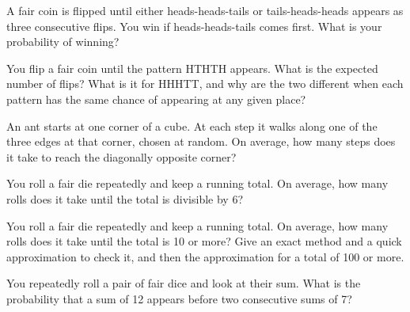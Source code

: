 \begin{question}\label{iq:iv1:waiting-times-and-markov-chains:6}
A fair coin is flipped until either heads-heads-tails or tails-heads-heads appears as three consecutive flips. You win if heads-heads-tails comes
first. What is your probability of winning?
\end{question}

\begin{question}\label{iq:iv1:waiting-times-and-markov-chains:7}
You flip a fair coin until the pattern HTHTH appears. What is the expected number of flips? What is it for HHHTT, and why are the two different when each pattern has the same chance of appearing at any given place?
\end{question}

\begin{question}\label{iq:iv1:waiting-times-and-markov-chains:8}
An ant starts at one corner of a cube. At each step it walks along one of the three edges at that corner, chosen at random. On average, how many
steps does it take to reach the diagonally opposite corner?
\end{question}

\begin{question}\label{iq:iv1:waiting-times-and-markov-chains:9}
You roll a fair die repeatedly and keep a running total. On average, how many rolls does it take until the total is divisible by 6?
\end{question}

\begin{question}\label{iq:iv1:waiting-times-and-markov-chains:10}
You roll a fair die repeatedly and keep a running total. On average, how many rolls does it take until the total is 10 or more? Give an exact method and a quick
approximation to check it, and then the approximation for a total of 100 or more.
\end{question}

\begin{question}\label{iq:iv1:waiting-times-and-markov-chains:11}
You repeatedly roll a pair of fair dice and look at their sum. What is the probability that a sum of 12 appears before two consecutive sums of 7?
\end{question}

